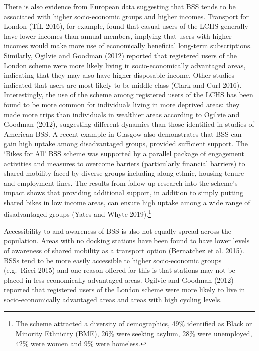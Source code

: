 \documentclass[
]{article}
\begin{document}
There is also evidence from European data suggesting that BSS tends to be associated with higher socio-economic groups and higher incomes.
Transport for London (TfL 2016), for example, found that casual users of the LCHS generally have lower incomes than annual members, implying that users with higher incomes would make more use of economically beneficial long-term subscriptions.
Similarly, Ogilvie and Goodman (2012) reported that registered users of the London scheme were more likely living in socio-economically advantaged areas, indicating that they may also have higher disposable income.
Other studies indicated that users are most likely to be middle-class (Clark and Curl 2016).
Interestingly, the use of the scheme among registered users of the LCHS has been found to be more common for individuals living in more deprived areas: they made more trips than individuals in wealthier areas according to Ogilvie and Goodman (2012), suggesting different dynamics than those identified in studies of American BSS.
A recent example in Glasgow also demonstrates that BSS can gain high uptake among disadvantaged groups, provided sufficient support.
The `\href{https://www.nextbike.co.uk/en/news/nextbike-provides-bikes-for-all-as-scheme-celebrates-community/}{Bikes for All}' BSS scheme was supported by a parallel package of engagement activities and measures to overcome barriers (particularly financial barriers) to shared mobility faced by diverse groups including along ethnic, housing tenure and employment lines.
The results from follow-up research into the scheme's impact shows that providing additional support, in addition to simply putting shared bikes in low income areas, can ensure high uptake among a wide range of disadvantaged groups (Yates and Whyte 2019).\footnote{
  The scheme attracted a diversity of demographics, 49\% identified as Black or Minority Ethnicity (BME), 26\% were seeking asylum, 28\% were unemployed, 42\% were women and 9\% were homeless.}

Accessibility to and awareness of BSS is also not equally spread across the population.
Areas with no docking stations have been found to have lower levels of awareness of shared mobility as a transport option (Bernatchez et al. 2015).
BSSs tend to be more easily accessible to higher socio-economic groups (e.g.~Ricci 2015) and one reason offered for this is that stations may not be placed in less economically advantaged areas.
Ogilvie and Goodman (2012) reported that registered users of the London scheme were more likely to live in socio-economically advantaged areas and areas with high cycling levels.
\end{document}
